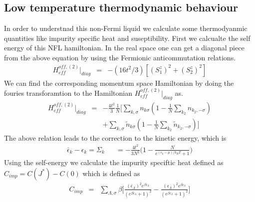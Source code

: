 \documentclass[reprint,prb,superscriptaddress]{revtex4-2}
\begin{document}
\subsection{Low temperature thermodynamic behaviour}
\noindent In order to understnad this non-Fermi liquid we calculate some thermodyanmic quantities like impurity specific heat and suseptibility. First we calcualte the self energy of this NFL hamiltonian. In the real space one can get a diagonal piece from the above equation by using the Fermionic anticommutation relations.
\begin{eqnarray}
H_{eff}^{off,(2)} |_{diag} &=& -(16t^2/3) [ (S_1^z)^2+ (S_2^z)^2 ]   
\end{eqnarray}
We can find the corresponding momentum space Hamiltonian by doing the fouries transforamtion to the Hamiltonian  $H_{eff}^{off,(2)} |_{diag} $ as.
\begin{eqnarray}
H_{eff}^{off,(2)} |_{diag}&=& -\frac{4t^2}{3} \frac{1}{N} \bigg[ \displaystyle\sum_{k,\sigma} n_{k\sigma}(1-\frac{1}{N} \displaystyle\sum_{k_2}  n_{k_2,-\sigma}  ) \nonumber\\
&&+ \displaystyle\sum_{k,\sigma} \tilde{n}_{k\sigma} ( 1-\frac{1}{N} \displaystyle\sum_{ k_2} \tilde{n}_{k_2,-\sigma}  ) \bigg]  
\end{eqnarray}
The above relation leads to the correction to the kinetic energy, which is
\begin{eqnarray}
\bar{\epsilon}
_k-\epsilon_k=\Sigma_k 
&&= -\frac{4t^2}{3N^2}\bigg(1-\frac{N}{e^{(\epsilon_k-\mu)/k_BT}+1}\bigg)
\label{eq:self-energy-NFL}
\end{eqnarray}
Using the self-energy we calculate the impurity speciftic heat defined as $C_{imp}=C(J^*)-C(0)$ which is defined as
\begin{eqnarray}
C_{imp} &=& \sum_{\Lambda,\sigma} \beta \bigg[ \frac{(\bar{\epsilon}_{\Lambda})^2 e^{\beta \bar{\epsilon}_{\Lambda}}}{( e^{\beta \bar{\epsilon}_{\Lambda}} +1)^2}  -\frac{({\epsilon}_{\Lambda})^2 e^{\beta {\epsilon}_{\Lambda}}}{( e^{\beta {\epsilon}_{\Lambda}} +1)^2} \bigg]
\end{eqnarray}
\end{document}
